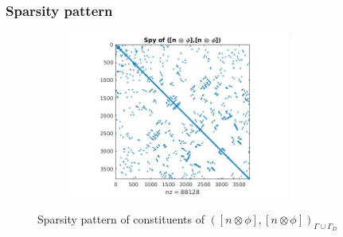 \documentclass{beamer}
\begin{document}
\begin{frame}
\frametitle{Sparsity pattern}
\begin{figure}
  \begin{subfigure}{0.8\textwidth}	
\centering
  \includegraphics[width=0.8\textwidth]{figure2.jpg}
  \label{fig:figure2}
\end{subfigure}
\caption{Sparsity pattern of constituents of $([n \otimes \phi],[n \otimes \phi])_{\Gamma \cup \Gamma_D}$}
\label{figure_2_all}
\end{figure}
\end{frame}
\end{document}
